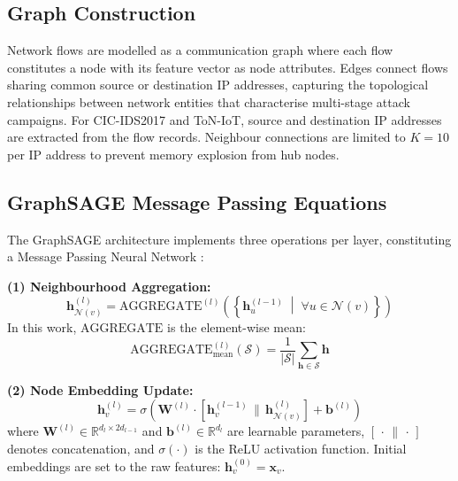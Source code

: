\documentclass[conference]{IEEEtran}
\begin{document}
\subsection{Graph Construction}

Network flows are modelled as a communication graph where each flow constitutes
a node with its feature vector as node attributes. Edges connect flows sharing
common source or destination IP addresses, capturing the topological
relationships between network entities that characterise multi-stage attack
campaigns. For CIC-IDS2017 and ToN-IoT, source and destination IP addresses
are extracted from the flow records. Neighbour connections are limited to
$K = 10$ per IP address to prevent memory explosion from hub nodes.

\subsection{GraphSAGE Message Passing Equations}

The GraphSAGE architecture \cite{hamilton2017} implements three operations per
layer, constituting a Message Passing Neural Network \cite{gilmer2017}:

\textbf{(1) Neighbourhood Aggregation:}
\begin{equation}
\mathbf{h}_{\mathcal{N}(v)}^{(l)} = \text{AGGREGATE}^{(l)}\!\left(\left\{
\mathbf{h}_u^{(l-1)} \;\middle|\; \forall u \in \mathcal{N}(v)\right\}\right)
\label{eq:aggregate}
\end{equation}
In this work, $\text{AGGREGATE}$ is the element-wise mean:
\begin{equation}
\text{AGGREGATE}^{(l)}_{\text{mean}}\!\left(\mathcal{S}\right)
= \frac{1}{|\mathcal{S}|} \sum_{\mathbf{h} \in \mathcal{S}} \mathbf{h}
\label{eq:mean_agg}
\end{equation}

\textbf{(2) Node Embedding Update:}
\begin{equation}
\mathbf{h}_v^{(l)} = \sigma\!\left(\mathbf{W}^{(l)} \cdot
\left[\mathbf{h}_v^{(l-1)} \,\|\, \mathbf{h}_{\mathcal{N}(v)}^{(l)}\right]
+ \mathbf{b}^{(l)}\right)
\label{eq:update}
\end{equation}
where $\mathbf{W}^{(l)} \in \mathbb{R}^{d_l \times 2d_{l-1}}$ and
$\mathbf{b}^{(l)} \in \mathbb{R}^{d_l}$ are learnable parameters,
$[\,\cdot\,\|\,\cdot\,]$ denotes concatenation, and $\sigma(\cdot)$ is the
ReLU activation function. Initial embeddings are set to the raw features:
$\mathbf{h}_v^{(0)} = \mathbf{x}_v$.
\end{document}
